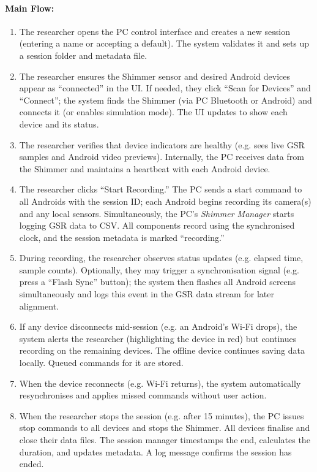 \paragraph{Main Flow:}
\begin{enumerate}
	\item The researcher opens the PC control interface and creates a new session (entering a name or accepting a default). The system validates it and sets up a session folder and metadata file.
	\item The researcher ensures the Shimmer sensor and desired Android devices appear as “connected” in the UI. If needed, they click “Scan for Devices” and “Connect”; the system finds the Shimmer (via PC Bluetooth or Android) and connects it (or enables simulation mode). The UI updates to show each device and its status.
	\item The researcher verifies that device indicators are healthy (e.g. sees live GSR samples and Android video previews). Internally, the PC receives data from the Shimmer and maintains a heartbeat with each Android device.
	\item The researcher clicks “Start Recording.” The PC sends a start command to all Androids with the session ID; each Android begins recording its camera(s) and any local sensors. Simultaneously, the PC’s \textit{Shimmer Manager} starts logging GSR data to CSV. All components record using the synchronised clock, and the session metadata is marked “recording.”
	\item During recording, the researcher observes status updates (e.g. elapsed time, sample counts). Optionally, they may trigger a synchronisation signal (e.g. press a “Flash Sync” button); the system then flashes all Android screens simultaneously and logs this event in the GSR data stream for later alignment.
	\item If any device disconnects mid-session (e.g. an Android’s Wi-Fi drops), the system alerts the researcher (highlighting the device in red) but continues recording on the remaining devices. The offline device continues saving data locally. Queued commands for it are stored.
	\item When the device reconnects (e.g. Wi-Fi returns), the system automatically resynchronises and applies missed commands without user action.
	\item When the researcher stops the session (e.g. after 15 minutes), the PC issues stop commands to all devices and stops the Shimmer. All devices finalise and close their data files. The session manager timestamps the end, calculates the duration, and updates metadata. A log message confirms the session has ended.

\end{enumerate}
